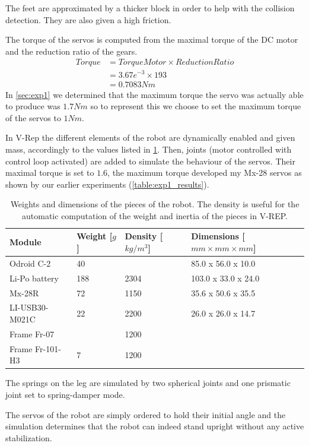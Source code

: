 The feet are approximated by a thicker block in order to help with the collision detection. They are also given a high friction.

The torque of the servos is computed from the maximal torque of the DC motor and the reduction ratio of the gears. 
\begin{align*}
Torque &= TorqueMotor \times ReductionRatio\\
&= 3.67e^{-3} \times 193\\
&= 0.7083Nm
\end{align*}
In \cref{sec:exp1} we determined that the maximum torque the servo was actually able to produce was $1.7Nm$ so to represent this we choose to set the maximum torque of the servos to $1Nm$.

In V-Rep the different elements of the robot are dynamically enabled and given mass, accordingly to the values listed in \cref{table:weights}. Then, joints (motor controlled with control loop activated) are added to simulate the behaviour of the servos. Their maximal torque is set to $1.6$, the maximum torque developed my Mx-28 servos as shown by our earlier experiments (\cref{table:exp1_results}). 

\begin{table}[htp]
\center
\begin{tabularx}{\textwidth}{@{} l X X l @{}}
\toprule
\textbf{Module} & \textbf{Weight [$g$]} &  \textbf{Density [$kg/m^3$]}& \textbf{Dimensions [$mm \times mm \times mm$]}\\ 
\midrule
Odroid C-2 & 40 &  & 85.0 x 56.0 x 10.0\\
Li-Po battery & 188 & 2304 & 103.0 x 33.0 x 24.0\\
Mx-28R & 72 & 1150 & 35.6 x 50.6 x 35.5\\
LI-USB30-M021C & 22 & 2200 & 26.0 x 26.0 x 14.7\\
Frame Fr-07 & & 1200 & \\
Frame Fr-101-H3 & 7 & 1200 & \\
\bottomrule
\end{tabularx}
\caption[Weights and dimensions of the pieces of the robot]{Weights and dimensions of the pieces of the robot. The density is useful for the automatic computation of the weight and inertia of the pieces in V-REP.}
\label{table:weights}
\end{table}

The springs on the leg are simulated by two spherical joints and one prismatic joint set to spring-damper mode.

The servos of the robot are simply ordered to hold their initial angle and the simulation determines that the robot can indeed stand upright without any active stabilization.

